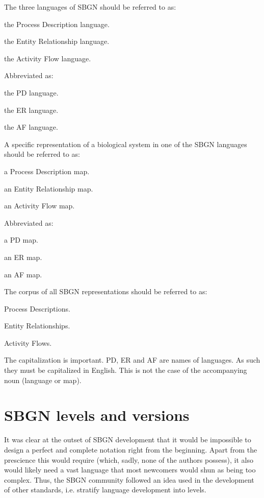 The three languages of SBGN should be referred to as:
\begin{compactitem}
\item the Process Description language.
\item the Entity Relationship language.
\item the Activity Flow language.
\end{compactitem}

Abbreviated as:
\begin{compactitem}
\item the PD language.
\item the ER language.
\item the AF language.
\end{compactitem}

A specific representation of a biological system in one of the SBGN languages should be referred to as:
\begin{compactitem}
\item a Process Description map.
\item an Entity Relationship map.
\item an Activity Flow map.
\end{compactitem}

Abbreviated as:
\begin{compactitem}
\item a PD map.
\item an ER map.
\item an AF map.
\end{compactitem}

The corpus of all SBGN representations should be referred to as:
\begin{compactitem}
\item Process Descriptions.
\item Entity Relationships.
\item Activity Flows.
\end{compactitem}

The capitalization is important. PD, ER and AF are names of languages. 
As such they must be capitalized in English. This is not the case of the accompanying noun (language or map).



\section{SBGN levels and versions}
\label{sec:sbgn-levels}

It was clear at the outset of SBGN development that it would be impossible 
to design a perfect and complete notation right from the beginning.  Apart 
from the prescience this would require (which, sadly, none of the authors 
possess), it also would likely need a vast language that most newcomers 
would shun as being too complex.  Thus, the SBGN community followed an idea 
used in the development of other standards, i.e. stratify language 
development into levels.

